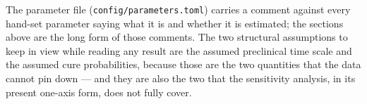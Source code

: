 \documentclass[12pt,a4paper]{article}
\newcommand{\id}[1]{\texttt{#1}}
\begin{document}
The parameter file (\id{config/parameters.toml}) carries a comment against every hand-set parameter saying
what it is and whether it is estimated; the sections above are the long form of those comments. The two
structural assumptions to keep in view while reading any result are the assumed preclinical time scale and
the assumed cure probabilities, because those are the two quantities that the data cannot pin down --- and
they are also the two that the sensitivity analysis, in its present one-axis form, does not fully cover.
\end{document}
